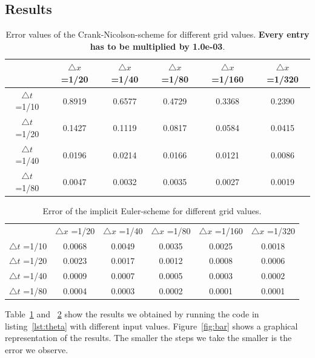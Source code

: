 \documentclass[ twoside,openright,titlepage,numbers=noenddot,headinclude,%
                footinclude=true,cleardoublepage=empty,abstractoff, %
                BCOR=5mm,paper=a4,fontsize=11pt,%
                ngerman,american,%
                ]{scrreprt}
\begin{document}
\subsection{Results}
\begin{table}
\begin{tabular}{|c|c|c|c|c|c|} \hline
			  & $\triangle x$ =1/20&$\triangle x$ =1/40&$\triangle x$ =1/80&$\triangle x$ =1/160&$\triangle x$ =1/320 \\ \hline 
$\triangle t$ =1/10	  & 0.8919 &   0.6577 &   0.4729 &   0.3368 &   0.2390	\\ 
$\triangle t$ =1/20	  & 0.1427 &   0.1119 &   0.0817 &   0.0584 &   0.0415	\\
$\triangle t$ =1/40	  & 0.0196 &   0.0214 &   0.0166 &   0.0121 &   0.0086	\\
$\triangle t$ =1/80 	  & 0.0047 &   0.0032 &   0.0035 &   0.0027 &   0.0019	\\ \hline
\end{tabular}
\caption{Error values of the Crank-Nicolson-scheme for different grid values. \textbf{Every entry has to be multiplied by 1.0e-03}.}
\label{tab:CN}
\end{table}
\begin{table}
\begin{tabular}{|c|c|c|c|c|c|} \hline
	& $\triangle x$ =1/20&$\triangle x$ =1/40&$\triangle x$ =1/80&$\triangle x$ =1/160&$\triangle x$ =1/320 \\
$\triangle t$ =1/10	& 0.0068  &  0.0049  &  0.0035  &  0.0025  &  0.0018 \\
$\triangle t$ =1/20	& 0.0023  &  0.0017  &  0.0012  &  0.0008  &  0.0006 \\
$\triangle t$ =1/40	& 0.0009  &  0.0007  &  0.0005  &  0.0003  &  0.0002 \\
$\triangle t$ =1/80	& 0.0004  &  0.0003  &  0.0002  &  0.0001  &  0.0001 \\ \hline
\end{tabular}
\caption{Error of the implicit Euler-scheme for different grid values.}
\label{tab:IE}
\end{table}
Table~\ref{tab:CN} and ~\ref{tab:IE} show the results we obtained by running the code in listing~\ref{lst:theta} with different input values. Figure~\ref{fig:bar} shows a graphical representation of the results. The smaller the steps we take the smaller is the error we observe.     
      
\end{document}
